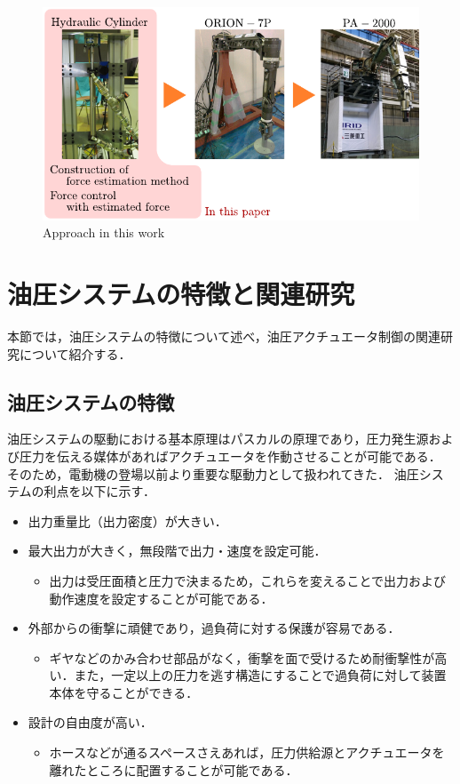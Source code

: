 \begin{figure}[t]
    \centering
        \includegraphics[keepaspectratio, scale=1.0]{contents/緒言/figure/approach_thiswork.pdf}
        \caption{Approach in this work}
        \label{fig:approach_thiswork}
\end{figure}

\section{油圧システムの特徴と関連研究}
本節では，油圧システムの特徴について述べ，油圧アクチュエータ制御の関連研究について紹介する．
\subsection{油圧システムの特徴}

油圧システムの駆動における基本原理はパスカルの原理\cite{PascalsLaw}であり，圧力発生源および圧力を伝える媒体があればアクチュエータを作動させることが可能である．
そのため，電動機の登場以前より重要な駆動力として扱われてきた．
油圧システムの利点を以下に示す\cite{jelali2012hydraulic,不二越ハイドロニクスチーム199305}．
\begin{itemize}
    \item 出力重量比（出力密度）が大きい．
    \item 最大出力が大きく，無段階で出力・速度を設定可能．
    \begin{itemize}
        \item 出力は受圧面積と圧力で決まるため，これらを変えることで出力および動作速度を設定することが可能である．
    \end{itemize}
    \item 外部からの衝撃に頑健であり，過負荷に対する保護が容易である．
    \begin{itemize}
        \item ギヤなどのかみ合わせ部品がなく，衝撃を面で受けるため耐衝撃性が高い．また，一定以上の圧力を逃す構造にすることで過負荷に対して装置本体を守ることができる．
    \end{itemize}
    \item 設計の自由度が高い．
    \begin{itemize}
        \item ホースなどが通るスペースさえあれば，圧力供給源とアクチュエータを離れたところに配置することが可能である．
    \end{itemize}
\end{itemize}

